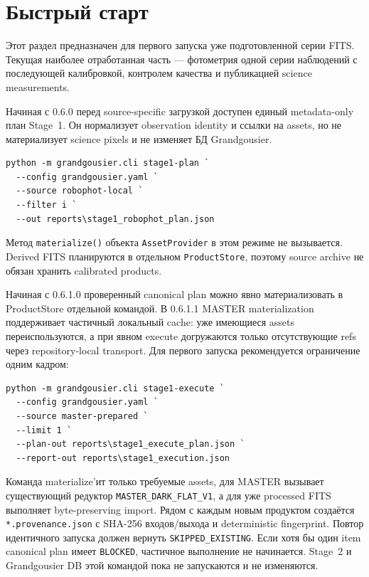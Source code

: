 \chapter{Быстрый старт}

Этот раздел предназначен для первого запуска уже подготовленной серии FITS. Текущая наиболее отработанная часть \program{} --- фотометрия одной серии наблюдений с последующей калибровкой, контролем качества и публикацией science measurements.

Начиная с 0.6.0 перед source-specific загрузкой доступен единый metadata-only план Stage~1. Он нормализует observation identity и ссылки на assets, но не материализует science pixels и не изменяет БД Grandgousier.

\begin{lstlisting}
python -m grandgousier.cli stage1-plan `
  --config grandgousier.yaml `
  --source robophot-local `
  --filter i `
  --out reports\stage1_robophot_plan.json
\end{lstlisting}

Метод \texttt{materialize()} объекта \texttt{AssetProvider} в этом режиме не вызывается. Derived FITS планируются в отдельном \texttt{ProductStore}, поэтому source archive не обязан хранить calibrated products.

Начиная с 0.6.1.0 проверенный canonical plan можно явно материализовать в ProductStore отдельной командой. В 0.6.1.1 MASTER materialization поддерживает частичный локальный cache: уже имеющиеся assets переиспользуются, а при явном execute догружаются только отсутствующие refs через repository-local transport. Для первого запуска рекомендуется ограничение одним кадром:

\begin{lstlisting}
python -m grandgousier.cli stage1-execute `
  --config grandgousier.yaml `
  --source master-prepared `
  --limit 1 `
  --plan-out reports\stage1_execute_plan.json `
  --report-out reports\stage1_execution.json
\end{lstlisting}

Команда materialize'ит только требуемые assets, для MASTER вызывает существующий редуктор \texttt{MASTER\_DARK\_FLAT\_V1}, а для уже processed FITS выполняет byte-preserving import. Рядом с каждым новым продуктом создаётся \texttt{*.provenance.json} с SHA-256 входов/выхода и deterministic fingerprint. Повтор идентичного запуска должен вернуть \texttt{SKIPPED\_EXISTING}. Если хотя бы один item canonical plan имеет \texttt{BLOCKED}, частичное выполнение не начинается. Stage~2 и Grandgousier DB этой командой пока не запускаются и не изменяются.

